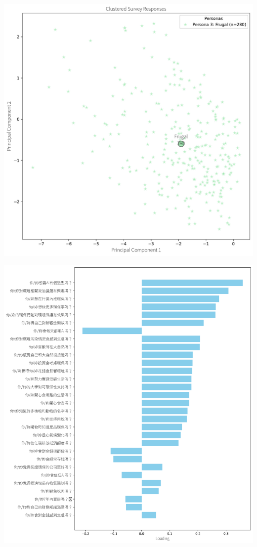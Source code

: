 \documentclass[
  letterpaper,
  DIV=11,
  numbers=noendperiod]{scrartcl}
\begin{document}
\includegraphics{_thesis_files/figure-pdf/cell-86-output-1.pdf}

\includegraphics{_thesis_files/figure-pdf/cell-86-output-2.pdf}
\end{document}
